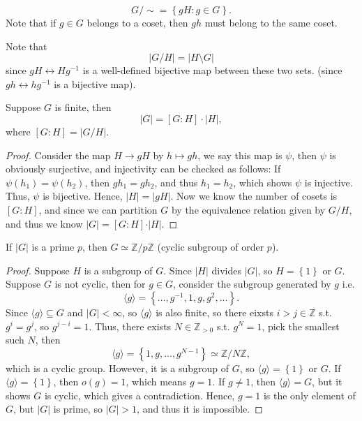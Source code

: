 \begin{prev}
    \[
        G / \sim = \left\{ g H: g \in G \right\}. 
    \]
    Note that if \(g \in G\) belongs to a coset, then \(gh\) must belong to the same coset.   
\end{prev}

Note that 
\[
    \left\vert G / H \right\vert = \left\vert H \setminus G \right\vert 
\] since \(gH \leftrightarrow Hg^{-1}\) is a well-defined bijective map between these two sets. (since \(gh \leftrightarrow h g^{-1} \) is a bijective map). 

\begin{theorem}
    Suppose \(G\) is finite, then 
    \[
        \left\vert G \right\vert = [G : H] \cdot \left\vert H \right\vert,  
    \] where \([G:H] = \vert G / H \vert \). 
\end{theorem}
\begin{proof}
    Consider the map \(H \to gH\) by \(h \mapsto gh\), we say this map is \(\psi \), then \(\psi \) is obviously surjective, and injectivity can be checked as follows: If \(\psi (h_1) = \psi (h_2)\), then \(g h_1 = g h_2\), and thus \(h_1 = h_2\), which shows \(\psi \) is injective. Thus, \(\psi \) is bijective. Hence, \(\vert H \vert = \vert gH \vert  \). Now we know the number of cosets is \([G:H]\), and since we can partition \(G\) by the equivalence relation given by \(G / H\), and thus we know \(\vert G \vert = [G:H] \cdot \vert H \vert  \).               
\end{proof}

\begin{proposition}
    If \(\vert G \vert \) is a prime \(p\), then \(G \simeq \mathbb{Z} / p\mathbb{Z} \) (cyclic subgroup of order \(p\)).   
\end{proposition}
\begin{proof}
    Suppose \(H\) is a subgroup of \(G\). Since \(\vert H \vert \) divides \(\vert G \vert \), so \(H = \left\{ 1 \right\} \) or \(G\). Suppose \(G\) is not cyclic, then for \(g \in G\), consider the subgroup generated by \(g\) i.e. 
    \[
        \langle g \rangle = \left\{ \dots , g^{-1}, 1, g, g^2, \dots  \right\}. 
    \]
    Since \(\langle g \rangle \subseteq G\) and \(\vert G \vert < \infty  \), so \(\langle g \rangle \) is also finite, so there eixsts \(i > j \in \mathbb{Z} \) s.t. \(g^i = g^j\), so \(g^{j - i} = 1\). Thus, there exists \(N \in \mathbb{Z} _{> 0}\) s.t. \(g^N = 1\), pick the smallest such \(N\), then
    \[
        \langle g \rangle = \left\{ 1, g, \dots , g^{N-1} \right\} \simeq \mathbb{Z} / N \mathbb{Z}, 
    \] which is a cyclic group. However, it is a subgroup of \(G\), so \(\langle g \rangle = \left\{ 1 \right\}   \) or \(G\). If \(\langle g \rangle = \left\{ 1 \right\}  \), then \(o(g) = 1\), which means \(g = 1\). If \(g \neq 1\), then \(\langle g \rangle = G\), but it shows \(G\) is cyclic, which gives a contradiction. Hence, \(g = 1\) is the only element of \(G\), but \(\vert G \vert \) is prime, so \(\vert G \vert > 1 \), and thus it is impossible.     
\end{proof}

